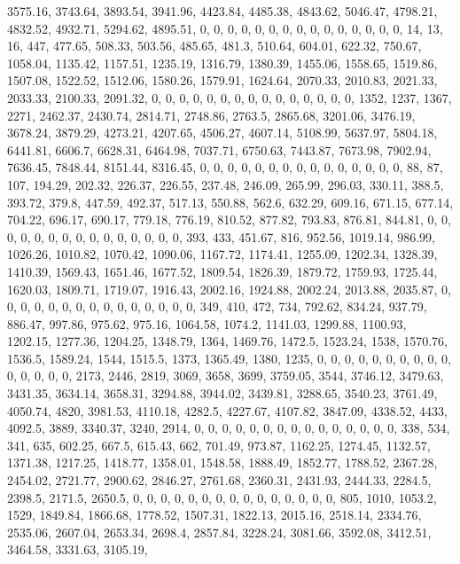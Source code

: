 \documentclass[
]{article}
\begin{document}
3575.16, 3743.64, 3893.54, 3941.96, 4423.84, 4485.38, 4843.62, 5046.47,
4798.21, 4832.52, 4932.71, 5294.62, 4895.51, 0, 0, 0, 0, 0, 0, 0, 0, 0,
0, 0, 0, 0, 0, 0, 14, 13, 16, 447, 477.65, 508.33, 503.56, 485.65,
481.3, 510.64, 604.01, 622.32, 750.67, 1058.04, 1135.42, 1157.51,
1235.19, 1316.79, 1380.39, 1455.06, 1558.65, 1519.86, 1507.08, 1522.52,
1512.06, 1580.26, 1579.91, 1624.64, 2070.33, 2010.83, 2021.33, 2033.33,
2100.33, 2091.32, 0, 0, 0, 0, 0, 0, 0, 0, 0, 0, 0, 0, 0, 0, 0, 1352,
1237, 1367, 2271, 2462.37, 2430.74, 2814.71, 2748.86, 2763.5, 2865.68,
3201.06, 3476.19, 3678.24, 3879.29, 4273.21, 4207.65, 4506.27, 4607.14,
5108.99, 5637.97, 5804.18, 6441.81, 6606.7, 6628.31, 6464.98, 7037.71,
6750.63, 7443.87, 7673.98, 7902.94, 7636.45, 7848.44, 8151.44, 8316.45,
0, 0, 0, 0, 0, 0, 0, 0, 0, 0, 0, 0, 0, 0, 0, 88, 87, 107, 194.29,
202.32, 226.37, 226.55, 237.48, 246.09, 265.99, 296.03, 330.11, 388.5,
393.72, 379.8, 447.59, 492.37, 517.13, 550.88, 562.6, 632.29, 609.16,
671.15, 677.14, 704.22, 696.17, 690.17, 779.18, 776.19, 810.52, 877.82,
793.83, 876.81, 844.81, 0, 0, 0, 0, 0, 0, 0, 0, 0, 0, 0, 0, 0, 0, 0,
393, 433, 451.67, 816, 952.56, 1019.14, 986.99, 1026.26, 1010.82,
1070.42, 1090.06, 1167.72, 1174.41, 1255.09, 1202.34, 1328.39, 1410.39,
1569.43, 1651.46, 1677.52, 1809.54, 1826.39, 1879.72, 1759.93, 1725.44,
1620.03, 1809.71, 1719.07, 1916.43, 2002.16, 1924.88, 2002.24, 2013.88,
2035.87, 0, 0, 0, 0, 0, 0, 0, 0, 0, 0, 0, 0, 0, 0, 0, 349, 410, 472,
734, 792.62, 834.24, 937.79, 886.47, 997.86, 975.62, 975.16, 1064.58,
1074.2, 1141.03, 1299.88, 1100.93, 1202.15, 1277.36, 1204.25, 1348.79,
1364, 1469.76, 1472.5, 1523.24, 1538, 1570.76, 1536.5, 1589.24, 1544,
1515.5, 1373, 1365.49, 1380, 1235, 0, 0, 0, 0, 0, 0, 0, 0, 0, 0, 0, 0,
0, 0, 0, 2173, 2446, 2819, 3069, 3658, 3699, 3759.05, 3544, 3746.12,
3479.63, 3431.35, 3634.14, 3658.31, 3294.88, 3944.02, 3439.81, 3288.65,
3540.23, 3761.49, 4050.74, 4820, 3981.53, 4110.18, 4282.5, 4227.67,
4107.82, 3847.09, 4338.52, 4433, 4092.5, 3889, 3340.37, 3240, 2914, 0,
0, 0, 0, 0, 0, 0, 0, 0, 0, 0, 0, 0, 0, 0, 338, 534, 341, 635, 602.25,
667.5, 615.43, 662, 701.49, 973.87, 1162.25, 1274.45, 1132.57, 1371.38,
1217.25, 1418.77, 1358.01, 1548.58, 1888.49, 1852.77, 1788.52, 2367.28,
2454.02, 2721.77, 2900.62, 2846.27, 2761.68, 2360.31, 2431.93, 2444.33,
2284.5, 2398.5, 2171.5, 2650.5, 0, 0, 0, 0, 0, 0, 0, 0, 0, 0, 0, 0, 0,
0, 0, 805, 1010, 1053.2, 1529, 1849.84, 1866.68, 1778.52, 1507.31,
1822.13, 2015.16, 2518.14, 2334.76, 2535.06, 2607.04, 2653.34, 2698.4,
2857.84, 3228.24, 3081.66, 3592.08, 3412.51, 3464.58, 3331.63, 3105.19,
\end{document}

